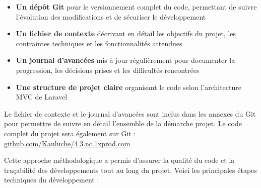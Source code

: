 \documentclass[a4paper,12pt]{report}
\begin{document}
  \begin{itemize}
    \item \textbf{Un dépôt Git} pour le versionnement complet du code, permettant de suivre l'évolution des modifications et de sécuriser le développement
    
    \item \textbf{Un fichier de contexte} décrivant en détail les objectifs du projet, les contraintes techniques et les fonctionnalités attendues
    
    \item \textbf{Un journal d'avancées} mis à jour régulièrement pour documenter la progression, les décisions prises et les difficultés rencontrées
    
    \item \textbf{Une structure de projet claire} organisant le code selon l'architecture MVC de Laravel
  \end{itemize}
  
  \begin{tcolorbox}[colback=lightgray!50,colframe=naturacorpgreen!75,title=\textbf{Note},fonttitle=\bfseries,coltitle=white,boxrule=0.5mm,arc=3mm]
    Le fichier de contexte et le journal d'avancées sont inclus dans les annexes du Git pour permettre de suivre en détail l'ensemble de la démarche projet. Le code complet du projet sera également sur Git : \href{https://github.com/Kauluche/4.3.nc.1xprod.com}{github.com/Kauluche/4.3.nc.1xprod.com}
  \end{tcolorbox}
  
  Cette approche méthodologique a permis d'assurer la qualité du code et la traçabilité des développements tout au long du projet. Voici les principales étapes techniques du développement :
  
\end{document}
